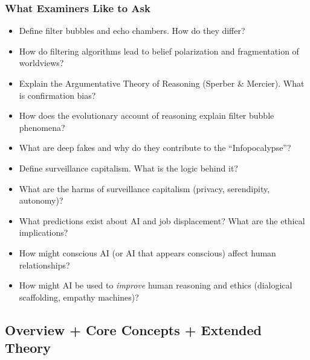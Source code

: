 \separator

\subsubsection*{What Examiners Like to Ask}

\begin{itemize}
  \item Define filter bubbles and echo chambers. How do they differ?
  \item How do filtering algorithms lead to belief polarization and fragmentation of worldviews?
  \item Explain the Argumentative Theory of Reasoning (Sperber \& Mercier). What is confirmation bias?
  \item How does the evolutionary account of reasoning explain filter bubble phenomena?
  \item What are deep fakes and why do they contribute to the ``Infopocalypse''?
  \item Define surveillance capitalism. What is the logic behind it?
  \item What are the harms of surveillance capitalism (privacy, serendipity, autonomy)?
  \item What predictions exist about AI and job displacement? What are the ethical implications?
  \item How might conscious AI (or AI that appears conscious) affect human relationships?
  \item How might AI be used to \textit{improve} human reasoning and ethics (dialogical scaffolding, empathy machines)?
\end{itemize}

\bigseparator

\subsection{Overview + Core Concepts + Extended Theory}

